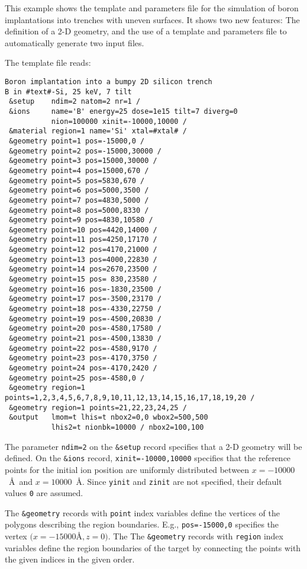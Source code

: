 This example shows the template and parameters file for the simulation of 
boron implantations into trenches with uneven surfaces. It shows two new
features: The definition of a 2-D geometry, and the use of a template and
parameters file to automatically generate two input files.

The template file reads:

\begin{verbatim}
Boron implantation into a bumpy 2D silicon trench
B in #text#-Si, 25 keV, 7 tilt
 &setup    ndim=2 natom=2 nr=1 /
 &ions     name='B' energy=25 dose=1e15 tilt=7 diverg=0
           nion=100000 xinit=-10000,10000 /
 &material region=1 name='Si' xtal=#xtal# /
 &geometry point=1 pos=-15000,0 /
 &geometry point=2 pos=-15000,30000 /
 &geometry point=3 pos=15000,30000 /
 &geometry point=4 pos=15000,670 /
 &geometry point=5 pos=5830,670 /
 &geometry point=6 pos=5000,3500 /
 &geometry point=7 pos=4830,5000 /
 &geometry point=8 pos=5000,8330 /
 &geometry point=9 pos=4830,10580 /
 &geometry point=10 pos=4420,14000 /
 &geometry point=11 pos=4250,17170 /
 &geometry point=12 pos=4170,21000 /
 &geometry point=13 pos=4000,22830 /
 &geometry point=14 pos=2670,23500 /
 &geometry point=15 pos= 830,23580 /
 &geometry point=16 pos=-1830,23500 /
 &geometry point=17 pos=-3500,23170 /
 &geometry point=18 pos=-4330,22750 /
 &geometry point=19 pos=-4500,20830 /
 &geometry point=20 pos=-4580,17580 /
 &geometry point=21 pos=-4500,13830 /
 &geometry point=22 pos=-4580,9170 /
 &geometry point=23 pos=-4170,3750 /
 &geometry point=24 pos=-4170,2420 /
 &geometry point=25 pos=-4580,0 /
 &geometry region=1 points=1,2,3,4,5,6,7,8,9,10,11,12,13,14,15,16,17,18,19,20 /
 &geometry region=1 points=21,22,23,24,25 /
 &output   lmom=t lhis=t nbox2=0,0 wbox2=500,500
           lhis2=t nionbk=10000 / nbox2=100,100
\end{verbatim}

The parameter \texttt{ndim=2} on the \texttt{\&setup} record specifies that a
2-D geometry will be defined. On the \texttt{\&ions} record,
\texttt{xinit=-10000,10000} specifies that the reference points for the initial
ion position are uniformly distributed between $x=-10000$~\AA\ and
$x=10000$~\AA. Since \texttt{yinit} and \texttt{zinit} are not specified, their
default values \texttt{0} are assumed.

The \texttt{\&geometry} records with \texttt{point} index variables define the
vertices of the polygons describing the region boundaries. E.g.,
\texttt{pos=-15000,0} specifies the vertex $(x=-15000$\AA$, z=0)$. The The
\texttt{\&geometry} records with \texttt{region} index variables define the
region boundaries of the target by connecting the points with the given indices
in the given order.

